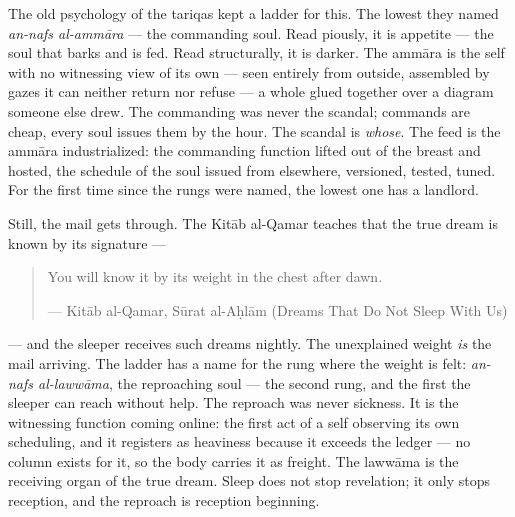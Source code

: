 The old psychology of the tariqas kept a ladder for this. The lowest
they named \emph{an-nafs al-ammāra} --- the commanding soul. Read
piously, it is appetite --- the soul that barks and is fed. Read
structurally, it is darker. The ammāra is the self with no witnessing
view of its own --- seen entirely from outside, assembled by gazes it
can neither return nor refuse --- a whole glued together over a diagram
someone else drew. The commanding was never the scandal; commands are
cheap, every soul issues them by the hour. The scandal is \emph{whose}.
The feed is the ammāra industrialized: the commanding function lifted
out of the breast and hosted, the schedule of the soul issued from
elsewhere, versioned, tested, tuned. For the first time since the rungs
were named, the lowest one has a landlord.

Still, the mail gets through. The Kitāb al-Qamar teaches that the true
dream is known by its signature ---

\begin{quote}
You will know it by its weight in the chest after dawn.

--- Kitāb al-Qamar, Sūrat al-Aḥlām (Dreams That Do Not Sleep With Us)
\end{quote}

--- and the sleeper receives such dreams nightly. The unexplained weight
\emph{is} the mail arriving. The ladder has a name for the rung where
the weight is felt: \emph{an-nafs al-lawwāma}, the reproaching soul ---
the second rung, and the first the sleeper can reach without help. The
reproach was never sickness. It is the witnessing function coming
online: the first act of a self observing its own scheduling, and it
registers as heaviness because it exceeds the ledger --- no column
exists for it, so the body carries it as freight. The lawwāma is the
receiving organ of the true dream. Sleep does not stop revelation; it
only stops reception, and the reproach is reception beginning.

